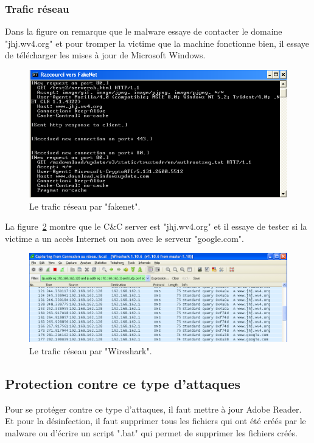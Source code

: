 \subsubsection*{Trafic réseau}
Dans la figure on remarque que le malware essaye de contacter le domaine "jhj.wv4.org" et pour tromper la victime que la machine fonctionne bien, il essaye de télécharger les mises à jour de Microsoft Windows.
\begin{figure}[H]
\begin{center}
\includegraphics[scale=0.7]{Figures/anal10.png}
\caption{Le trafic réseau par "fakenet".}
\label{fig :anal10} 
\end{center}
\end{figure}
La figure~\ref{fig :anal11} montre que le C\&C server est "jhj.wv4.org" et il essaye de tester si la victime a un accès Internet ou non avec le serveur "google.com".
\begin{figure}[H]
\begin{center}
\includegraphics[scale=0.7]{Figures/anal11.png}
\caption{Le trafic réseau par "Wireshark".}
\label{fig :anal11} 
\end{center}
\end{figure}
 
\subsection{Protection contre ce type d'attaques}
Pour se protéger contre ce type d'attaques, il faut mettre à jour Adobe Reader. Et pour la désinfection, il faut supprimer tous les fichiers qui ont été créés par le malware ou d'écrire un script ".bat" qui permet de supprimer les fichiers créés.

